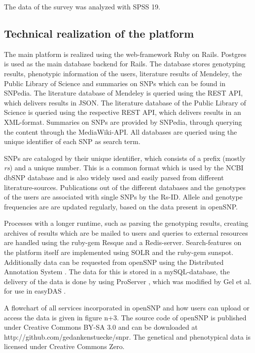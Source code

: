 \documentclass[10pt]{article}
\begin{document}
The data of the survey was analyzed with SPSS 19. 

\subsection*{Technical realization of the platform}
The main platform is realized using the web-framework Ruby on Rails. Postgres is used as the main database backend for Rails. The database stores genotyping results, phenotypic information of the users, literature results of Mendeley, the Public Library of Science and summaries on SNPs which can be found in SNPedia. The literature database of Mendeley is queried using the REST API, which delivers results in JSON. The literature database of the Public Library of Science is queried using the respective REST API, which delivers results in an XML-format. Summaries on SNPs are provided by SNPedia, through querying the content through the MediaWiki-API. All databases are queried using the unique identifier of each SNP as search term. 

SNPs are cataloged by their unique identifier, which consists of a prefix (mostly \textit{rs}) and a unique number. This is a common format which is used by the NCBI dbSNP database and is also widely used and easily parsed from different literature-sources. Publications out of the different databases and the genotypes of the users are associated with single SNPs by the Rs-ID. Allele and genotype frequencies are are updated regularly, based on the data present in openSNP. 

Processes with a longer runtime, such as parsing the genotyping results, creating archives of results which are be mailed to users and queries to external resources are handled using the ruby-gem Resque and a Redis-server. Search-features on the platform itself are implemented using SOLR and the ruby-gem sunspot. Additionally data can be requested from openSNP using the Distributed Annotation System \cite{Dowell2001,Jenkinson2008}. The data for this is stored in a mySQL-database, the delivery of the data is done by using ProServer \cite{Finn2007}, which was modified by Gel et al. for use in easyDAS \cite{GelMoreno2011}.  

A flowchart of all services incorporated in openSNP and how users can upload or access the data is given in figure n+3. The source code of openSNP is published under Creative Commons BY-SA 3.0 and can be downloaded at http://github.com/gedankenstuecke/snpr. The genetical and phenotypical data is licensed under Creative Commons Zero. 
\end{document}
